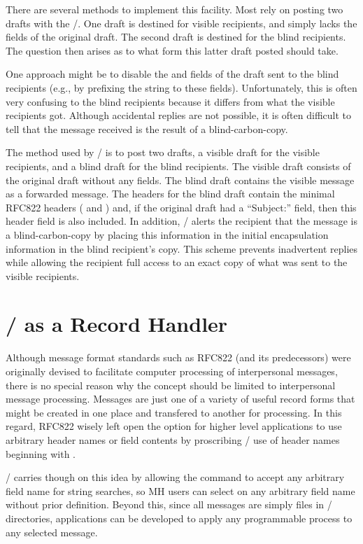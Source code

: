 There are several methods to implement this facility.
Most rely on posting two drafts with the \MTS/.
One draft is destined for visible recipients,
and simply lacks the  fields of the original draft.
The second draft is destined for the blind recipients.
The question then arises as to what form this latter draft posted should take.

One approach might be to disable the  and  fields of the
draft sent to the blind recipients
(e.g., by prefixing the string  to these fields).
Unfortunately,
this is often very confusing to the blind recipients
because it differs from what the visible recipients got.
Although accidental replies are not possible,
it is often difficult to tell that the message received is the result of a
blind-carbon-copy.

The method used by \MH/ is to post two drafts,
a visible draft for the visible recipients,
and a blind draft for the blind recipients.
The visible draft consists of the original draft without any  fields.
The blind draft contains the visible message as a forwarded message.
The headers for the blind draft contain the minimal RFC822 headers
( and )
and,
if the original draft had a ``Subject:'' field,
then this header field is also included.
In addition,
\MH/ alerts the recipient that the message is a blind-carbon-copy by
placing this information in the initial encapsulation information in the
blind recipient's copy.
This scheme prevents inadvertent replies while allowing the recipient
full access to an exact copy of what was sent to the visible recipients.

\section{\MH/ as a Record Handler}		%
Although message format standards such as RFC822
(and its predecessors) were originally devised to facilitate
computer processing of interpersonal messages,
there is no special reason why the concept should be
limited to interpersonal message processing.
Messages are just one of a variety of useful record forms that might
be created in one place and transfered to another for processing.
In this regard,
RFC822 wisely left open the option for higher level applications to use
arbitrary header names or field contents by proscribing \MTS/ use
of header names beginning with .

\MH/ carries though on this idea by allowing the  command
to accept any arbitrary field name for string searches,
so MH users can select on any arbitrary field name without prior definition.
Beyond this,
since all messages are simply files in \unix/ directories,
applications can be developed to apply any programmable process to
any selected message.

